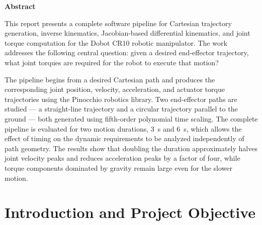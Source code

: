 \documentclass[12pt,a4paper]{article}
\begin{document}
\begin{titlepage}
    \centering
    \vspace*{\fill}

    {\Large\textbf{Abstract}\par}
    \vspace{1.0cm}

    \begin{minipage}{0.82\textwidth}
    \setlength{\parindent}{2.7em}
    \setlength{\parskip}{1.0em}

    This report presents a complete software pipeline for Cartesian trajectory generation,
    inverse kinematics, Jacobian-based differential kinematics, and joint torque computation
    for the Dobot CR10 robotic manipulator. The work addresses the following central question:
    given a desired end-effector trajectory, what joint torques are required for the robot
    to execute that motion?

    The pipeline begins from a desired Cartesian path and produces the corresponding joint
    position, velocity, acceleration, and actuator torque trajectories using the Pinocchio
    robotics library. Two end-effector paths are studied --- a straight-line trajectory and a
    circular trajectory parallel to the ground --- both generated using fifth-order polynomial
    time scaling. The complete pipeline is evaluated for two motion durations, \SI{3}{s} and
    \SI{6}{s}, which allows the effect of timing on the dynamic requirements to be analyzed
    independently of path geometry. The results show that doubling the duration approximately
    halves joint velocity peaks and reduces acceleration peaks by a factor of four, while
    torque components dominated by gravity remain large even for the slower motion.

    \end{minipage}

    \vspace*{\fill}
\end{titlepage}

\tableofcontents
\newpage

\section{Introduction and Project Objective}
\end{document}
